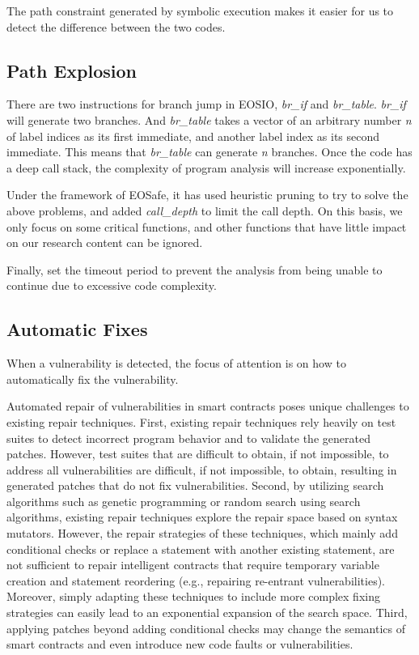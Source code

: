 \documentclass[a4paper, 10pt, conference, twocolumn]{ieeeconf}       %
\begin{document}
The path constraint generated by symbolic execution makes it easier for us to detect the difference between the two codes.

\subsection{Path Explosion}\label{4.2}
There are two instructions for branch jump in EOSIO,
\emph{br\_if} and \emph{br\_table}. \emph{br\_if} will generate two branches.
And \emph{br\_table} takes a vector of an arbitrary number \emph{n} of label indices as its first immediate,
and another label index as its second immediate.
This means that \emph{br\_table} can generate \emph{n} branches.
Once the code has a deep call stack, the complexity of program analysis will increase exponentially.\cite{272292}

Under the framework of EOSafe,
it has used heuristic pruning to try to solve the above problems,
and added \emph{call\_depth} to limit the call depth. On this basis,
we only focus on some critical functions,
and other functions that have little impact on our research content can be ignored.

Finally, set the timeout period to prevent the analysis from being unable to continue due to excessive code complexity.

\subsection{Automatic Fixes}

When a vulnerability is detected, the focus of attention is on how to automatically fix the vulnerability.

Automated repair of vulnerabilities in smart contracts poses unique challenges to existing repair techniques.
First, existing repair techniques rely heavily on test suites to detect incorrect program behavior and to validate the generated patches.
However, test suites that are difficult to obtain, if not impossible, to address all vulnerabilities are difficult, if not impossible, to obtain, resulting in generated patches that do not fix vulnerabilities.
Second, by utilizing search algorithms such as genetic programming or random search using search algorithms, existing repair techniques explore the repair space based on syntax mutators.
However, the repair strategies of these techniques, which mainly add conditional checks or replace a statement with another existing statement, are not sufficient to repair intelligent contracts that require temporary variable creation and statement reordering (e.g., repairing re-entrant vulnerabilities).
Moreover, simply adapting these techniques to include more complex fixing strategies can easily lead to an exponential expansion of the search space.
Third, applying patches beyond adding conditional checks may change the semantics of smart contracts and even introduce new code faults or vulnerabilities.
\end{document}
